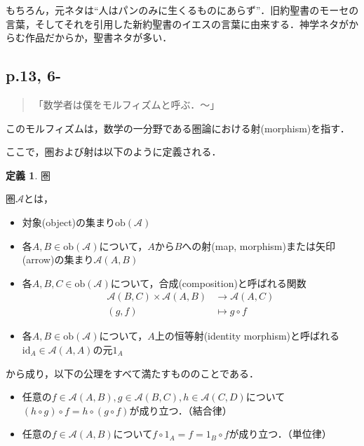 \documentclass[10pt, a5paper, twoside]{jsarticle}
\theoremstyle{definition}
\newtheorem{dfn}{定義}
\begin{document}
                もちろん，元ネタは“人はパンのみに生くるものにあらず”．旧約聖書のモーセの言葉，そしてそれを引用した新約聖書のイエスの言葉に由来する．神学ネタがからむ作品だからか，聖書ネタが多い．

            \subsection{p.13, 6-}

                \begin{quote}

                    「数学者は僕をモルフィズムと呼ぶ．〜」

                \end{quote}

                このモルフィズムは，数学の一分野である圏論における射(morphism)を指す．

                ここで，圏および射は以下のように定義される\cite{cat}．

                \begin{dfn}

                    圏

                    圏$\mathscr{A}$とは，
                    \begin{itemize}
                        \item 対象(object)の集まり$ \textrm{ob} ( \mathscr{A} ) $
                        \item 各$A, B \in \textrm{ob} ( \mathscr{A} ) $について，$A$から$B$への射(map, morphism)または矢印(arrow)の集まり$ \mathscr{A} ( A, B ) $
                        \item 各$A, B, C \in \textrm{ob} ( \mathscr{A} ) $について，合成(composition)と呼ばれる関数
                            \begin{align*}
                                \mathscr{A} ( B, C ) \times \mathscr{A} ( A, B ) &\to \mathscr{A} ( A, C ) \\
                                (g, f) &\mapsto g \circ f
                            \end{align*}
                        \item 各$A, B \in \textrm{ob} ( \mathscr{A} ) $について，$A$上の恒等射(identity morphism)と呼ばれる$ \textrm{id}_A \in \mathscr{A} ( A, A ) $の元$1_A$
                    \end{itemize}
                    から成り，以下の公理をすべて満たすもののことである．
                    \begin{itemize}
                        \item 任意の$f \in \mathscr{A} ( A, B ), g \in \mathscr{A} (B, C), h \in \mathscr{A} (C, D)$について$(h \circ g) \circ f = h \circ (g \circ f)$が成り立つ．（結合律）
                        \item 任意の$f \in \mathscr{A} ( A, B )$について$f \circ 1_A = f = 1_B \circ f$が成り立つ．（単位律）
                    \end{itemize}
                \end{dfn}
\end{document}
